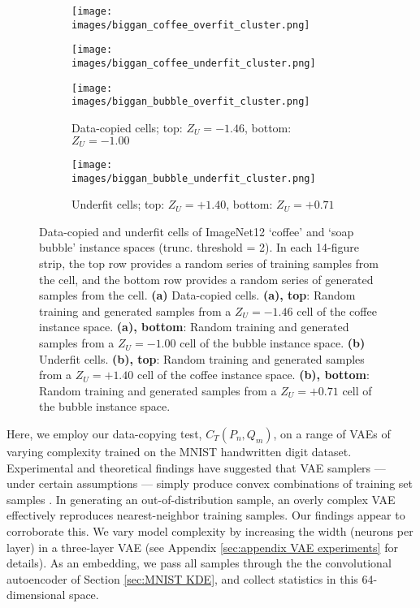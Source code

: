 \begin{figure*}[h]
    \centering
    \begin{subfigure}{0.49\linewidth}
        \centering
        \texttt{[image: images/biggan\_coffee\_overfit\_cluster.png]}
        \label{fig:biggan coffee overfit}
    \end{subfigure}
    \hfill
    \begin{subfigure}{0.49\linewidth}
        \centering
        \texttt{[image: images/biggan\_coffee\_underfit\_cluster.png]}
        \label{fig:biggan coffee underfit}
    \end{subfigure}
    \begin{subfigure}{0.49\linewidth}
        \centering
        \texttt{[image: images/biggan\_bubble\_overfit\_cluster.png]}
        \label{fig:biggan bubble overfit}
        \caption{Data-copied cells; top: $Z_U = -1.46$, bottom: $Z_U = -1.00$} 
    \end{subfigure}
    \hfill
    \begin{subfigure}{0.49\linewidth}
        \centering
        \texttt{[image: images/biggan\_bubble\_underfit\_cluster.png]}
        \label{fig:biggan bubble underfit}
        \caption{Underfit cells; top: $Z_U = +1.40$, bottom: $Z_U = +0.71$} 
    \end{subfigure}
    \caption[Data-copied and underfit cells of ImageNet12 `coffee' and `soap bubble' instance spaces (trunc. threshold = 2).]{Data-copied and underfit cells of ImageNet12 `coffee' and `soap bubble' instance spaces (trunc. threshold = 2). In each 14-figure strip, the top row provides a random series of training samples from the cell, and the bottom row provides a random series of generated samples from the cell. \textbf{(a)} Data-copied cells. \textbf{(a), top}: Random training and generated samples from a $Z_U = -1.46$ cell of the coffee instance space. \textbf{(a), bottom}: Random training and generated samples from a $Z_U = -1.00$ cell of the bubble instance space. \textbf{(b)} Underfit cells. \textbf{(b), top}: Random training and generated samples from a $Z_U = +1.40$ cell of the coffee instance space. \textbf{(b), bottom}: Random training and generated samples from a $Z_U = +0.71$ cell of the bubble instance space.  }
    \label{fig:biggan overfit underfit}
\end{figure*}

Here, we employ our data-copying test, $C_T(P_n, Q_m)$, on a range of VAEs of varying complexity trained on the MNIST handwritten digit dataset. Experimental and theoretical findings have suggested that VAE samplers --- under certain assumptions --- simply produce convex combinations of training set samples \citep{VAEs_overfit}. In generating an out-of-distribution sample, an overly complex VAE effectively reproduces nearest-neighbor training samples. Our findings appear to corroborate this. We vary model complexity by increasing the width (neurons per layer) in a three-layer VAE (see Appendix \ref{sec:appendix VAE experiments} for details). As an embedding, we pass all samples through the the convolutional autoencoder of Section \ref{sec:MNIST KDE}, and collect statistics in this 64-dimensional space.  

